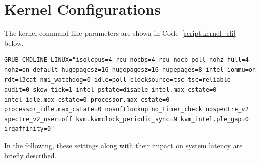\documentclass[MMR,Master,english]{twbook}
\begin{document}
\section{Kernel Configurations}\label{sec:kernel_configurations}

The kernel command-line parameters are shown in Code~\ref{script:kernel_cli} below. 

\vspace{1em}
\begin{minipage}{0.95\columnwidth}
	\begin{lstlisting}[name={Kernel Configuration},label={script:kernel_cli}]
		GRUB_CMDLINE_LINUX="isolcpus=4 rcu_nocbs=4 rcu_nocb_poll nohz_full=4 nohz=on default_hugepagesz=1G hugepagesz=1G hugepages=8 intel_iommu=on rdt=l3cat nmi_watchdog=0 idle=poll clocksource=tsc tsc=reliable audit=0 skew_tick=1 intel_pstate=disable intel.max_cstate=0 intel_idle.max_cstate=0 processor.max_cstate=0 processor_idle.max_cstate=0 nosoftlockup no_timer_check nospectre_v2 spectre_v2_user=off kvm.kvmclock_periodic_sync=N kvm_intel.ple_gap=0 irqaffinity=0"
\end{lstlisting}
\end{minipage}

\noindent In the following, these settings along with their impact on system latency are briefly described. 
\end{document}
